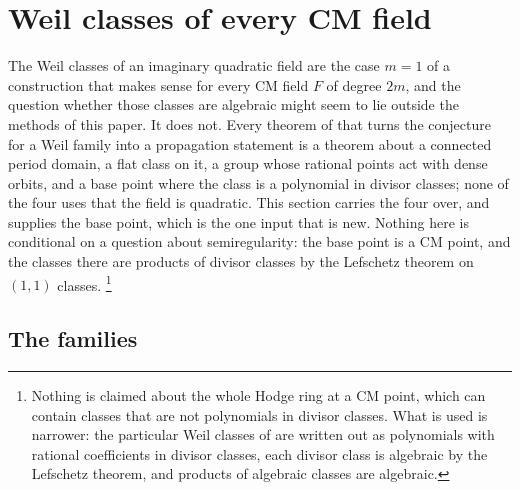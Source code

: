 \section{Weil classes of every CM field}\label{sec:cmfields}

The Weil classes of an imaginary quadratic field are the case $m=1$ of a
construction that makes sense for every CM field $F$ of degree $2m$, and the
question whether those classes are algebraic might seem to lie outside the
methods of this paper. It does not. Every theorem of  that turns the conjecture for a Weil
family into a propagation statement is a theorem about a connected period
domain, a flat class on it, a group whose rational points act with dense
orbits, and a base point where the class is a polynomial in divisor classes;
none of the four uses that the field is quadratic. This section carries the
four over, and supplies the base point, which is the one input that is new.
Nothing here is conditional on a question about semiregularity: the base
point is a CM point, and the classes there are products of divisor classes
by the Lefschetz theorem on $(1,1)$ classes.%
\footnote{Nothing is claimed about the whole Hodge ring at a CM point, which
can contain classes that are not polynomials in divisor classes. What is used
is narrower: the particular Weil classes of  are written
out as polynomials with rational coefficients in divisor classes, each divisor
class is algebraic by the Lefschetz theorem, and products of algebraic classes
are algebraic.}

\subsection{The families}

